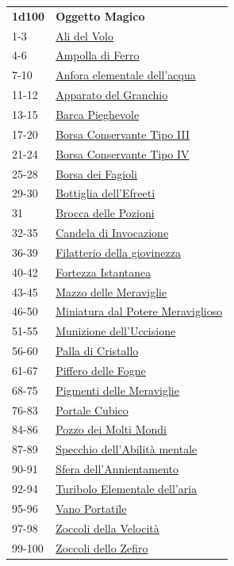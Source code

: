 \begin{multicols}{2}
{{\small\begin{tabularx}{0.45\textwidth}{lX}
\textbf{1d100} & \textbf{Oggetto Magico}\\
1-3 & \hyperlink{AlidelVolo}{Ali del Volo}\\
4-6 & \hyperlink{AmpolladiFerro}{Ampolla di Ferro}\\
7-10 & \hyperlink{Anforaelementaledell'acqua}{Anfora elementale dell'acqua}\\
11-12 & \hyperlink{ApparatodelGranchio}{Apparato del Granchio}\\
13-15 & \hyperlink{BarcaPieghevole}{Barca Pieghevole}\\
17-20 & \hyperlink{BorsaConservanteTipoIII}{Borsa Conservante Tipo III}\\
21-24 & \hyperlink{BorsaConservanteTipoIV}{Borsa Conservante Tipo IV}\\
25-28 & \hyperlink{BorsadeiFagioli}{Borsa dei Fagioli}\\
29-30 & \hyperlink{Bottigliadell'Efreeti}{Bottiglia dell'Efreeti}\\
31 & \hyperlink{BroccadellePozioni}{Brocca delle Pozioni}\\
32-35 & \hyperlink{CandeladiInvocazione}{Candela di Invocazione}\\
36-39 & \hyperlink{Filatteriodellagiovinezza}{Filatterio della giovinezza}\\
40-42 & \hyperlink{FortezzaIstantanea}{Fortezza Istantanea}\\
43-45 & \hyperlink{MazzodelleMeraviglie}{Mazzo delle Meraviglie}\\
46-50 & \hyperlink{Miniatura dal Potere Meraviglioso}{Miniatura dal Potere Meraviglioso}\\
51-55 & \hyperlink{Munizionedell'Uccisione}{Munizione dell'Uccisione}\\
56-60 & \hyperlink{PalladiCristallo}{Palla di Cristallo}\\
61-67 & \hyperlink{PifferodelleFogne}{Piffero delle Fogne}\\
68-75 & \hyperlink{PigmentidelleMeraviglie}{Pigmenti delle Meraviglie}\\
76-83 & \hyperlink{PortaleCubico}{Portale Cubico}\\
84-86 & \hyperlink{PozzodeiMoltiMondi}{Pozzo dei Molti Mondi}\\
87-89 & \hyperlink{Specchio dell'Abilità mentale}{Specchio dell'Abilità mentale}\\
90-91 & \hyperlink{Sferadell'Annientamento}{Sfera dell'Annientamento}\\
92-94 & \hyperlink{TuriboloElementaledell'aria}{Turibolo Elementale dell'aria}\\
95-96 & \hyperlink{VanoPortatile}{Vano Portatile}\\
97-98 & \hyperlink{ZoccolidellaVelocità}{Zoccoli della Velocità}\\
99-100 & \hyperlink{ZoccolidelloZefiro}{Zoccoli dello Zefiro}
\end{tabularx}}


}
\end{multicols}
